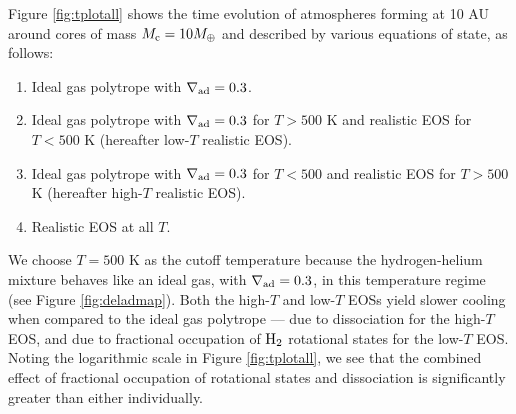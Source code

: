 \documentclass[apj]{emulateapj}
\newcommand{\delad}{\nabla_{\rm ad}}
\newcommand{\co}{_{\rm c}}
\begin{document}
Figure \ref{fig:tplotall} shows the time evolution of atmospheres forming at 10 AU around cores of mass $M\co=10 M_{\oplus}$ and described by various equations of state, as follows:
\begin{enumerate}
\item Ideal gas polytrope with $\delad=0.3$.
\item Ideal gas polytrope with $\delad=0.3$ for $T>500$ K and realistic EOS for $T<500$ K (hereafter low-$T$ realistic EOS).
\item Ideal gas polytrope with $\delad=0.3$ for $T<500$ and realistic EOS for $T>500$ K  (hereafter high-$T$ realistic EOS).
\item Realistic EOS at all $T$. 
\end{enumerate}
We choose $T=500$ K as the cutoff temperature because the hydrogen-helium mixture behaves like an ideal gas, with $\delad=0.3$, in this temperature regime (see Figure \ref{fig:deladmap}). 
Both the high-$T$ and low-$T$ EOSs yield slower cooling when compared to the ideal gas polytrope --- due to dissociation for the high-$T$ EOS, and due to fractional occupation of $\rm H_2$ rotational states for the low-$T$ EOS.
Noting the logarithmic scale in Figure \ref{fig:tplotall}, we see that the combined effect of fractional occupation of rotational states and dissociation is significantly greater than either individually. %
  
\end{document}
